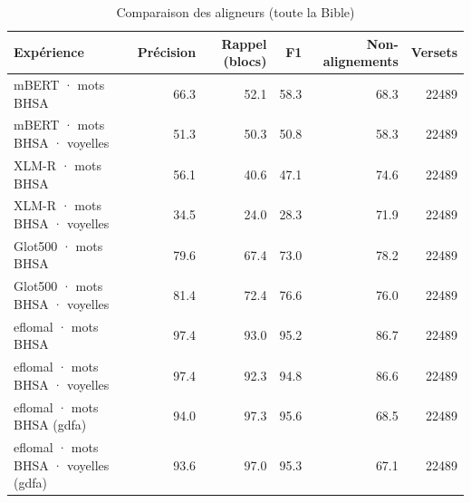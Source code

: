 \begin{table}[ht]
\centering
\caption{Comparaison des aligneurs (toute la Bible)}
\label{tab:comparaison_des_aligneurs_toute_la_bible}
\begin{tabular}{lrrrrr}
\toprule
Expérience & Précision & Rappel (blocs) & F1 & Non-alignements & Versets \\
\midrule
mBERT · mots BHSA & 66.3 & 52.1 & 58.3 & 68.3 & 22489 \\
mBERT · mots BHSA · voyelles & 51.3 & 50.3 & 50.8 & 58.3 & 22489 \\
XLM-R · mots BHSA & 56.1 & 40.6 & 47.1 & 74.6 & 22489 \\
XLM-R · mots BHSA · voyelles & 34.5 & 24.0 & 28.3 & 71.9 & 22489 \\
Glot500 · mots BHSA & 79.6 & 67.4 & 73.0 & 78.2 & 22489 \\
Glot500 · mots BHSA · voyelles & 81.4 & 72.4 & 76.6 & 76.0 & 22489 \\
eflomal · mots BHSA & 97.4 & 93.0 & 95.2 & 86.7 & 22489 \\
eflomal · mots BHSA · voyelles & 97.4 & 92.3 & 94.8 & 86.6 & 22489 \\
eflomal · mots BHSA (gdfa) & 94.0 & 97.3 & 95.6 & 68.5 & 22489 \\
eflomal · mots BHSA · voyelles (gdfa) & 93.6 & 97.0 & 95.3 & 67.1 & 22489 \\
\bottomrule
\end{tabular}
\end{table}
